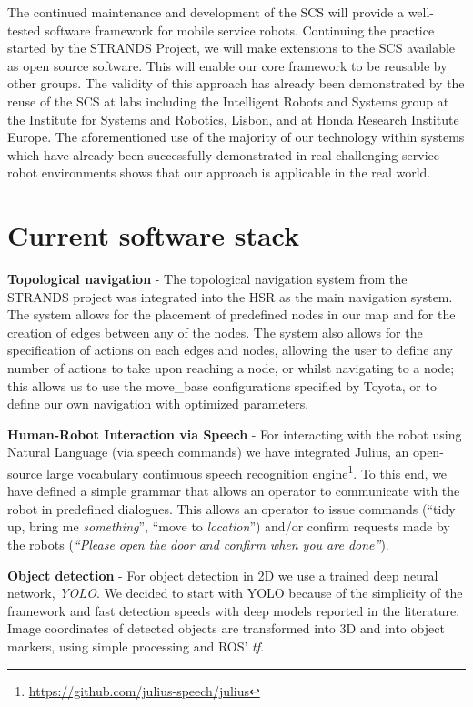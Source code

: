 \documentclass[runningheads,a4paper]{llncs}
\begin{document}
The continued maintenance and development of the SCS will provide a well-tested software framework for mobile service robots. Continuing the practice started by the STRANDS Project, we will make extensions to the SCS available as open source software. This will enable our core framework to be reusable by other groups. The validity of this approach has already been demonstrated by the reuse of the SCS at labs including the Intelligent Robots and Systems group at the Institute for Systems and Robotics, Lisbon, and at Honda Research Institute Europe. The aforementioned use of the majority of our technology within systems which have already been successfully demonstrated in real challenging service robot environments shows that our approach is applicable in the real world.

\section{Current software stack}
\textbf{Topological navigation} - The topological navigation system from the STRANDS project was integrated into the HSR as the main navigation system. The system allows for the placement of predefined nodes in our map and for the creation of edges between any of the nodes. The system also allows for the specification of actions on each edges and nodes, allowing the user to define any number of actions to take upon reaching a node, or whilst navigating to a node; this allows us to use the move\_base configurations specified by Toyota, or to define our own navigation with optimized parameters. 

\textbf{Human-Robot Interaction via Speech} - For interacting with the robot using Natural Language (via speech commands) we have integrated Julius, an open-source large vocabulary continuous speech recognition engine\footnote{\url{https://github.com/julius-speech/julius}}. To this end, we have defined a simple grammar that allows an operator to communicate with the robot in predefined dialogues. This allows an operator to issue commands (``tidy up, bring me \emph{something}'', ``move to \emph{location}'') and/or confirm requests made by the robots (\emph{``Please open the door and confirm when you are done''}).  

\textbf{Object detection} - For object detection in 2D we use a trained deep neural network, \textit{YOLO}. We decided to start with YOLO because of the simplicity of the framework and fast detection speeds with deep models reported in the literature. Image coordinates of detected objects are transformed into 3D  and into object markers, using simple processing and ROS' \textit{tf}.  
\end{document}
